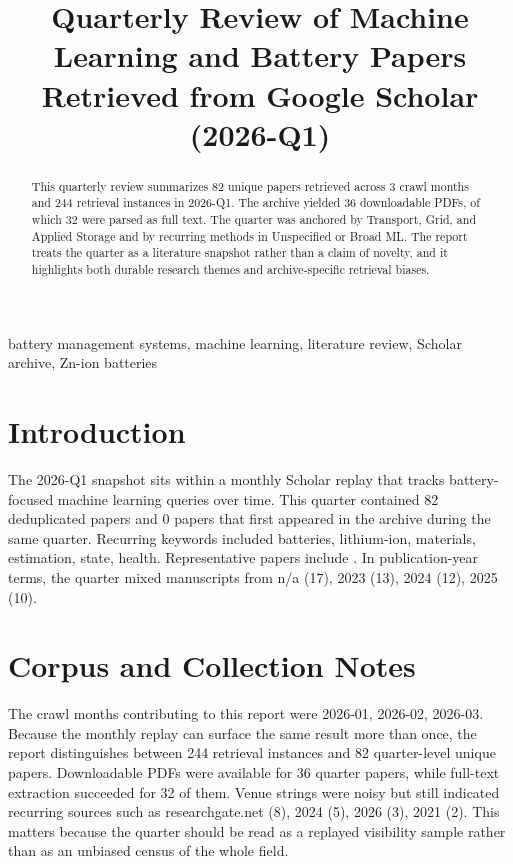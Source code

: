\documentclass[conference]{IEEEtran}
\begin{document}
\title{ Quarterly Review of Machine Learning and Battery Papers Retrieved from Google Scholar (2026-Q1) }

\author{
}

\maketitle

\begin{abstract}
This quarterly review summarizes 82 unique papers retrieved across 3 crawl months and 244 retrieval instances in 2026-Q1. The archive yielded 36 downloadable PDFs, of which 32 were parsed as full text. The quarter was anchored by Transport, Grid, and Applied Storage and by recurring methods in Unspecified or Broad ML. The report treats the quarter as a literature snapshot rather than a claim of novelty, and it highlights both durable research themes and archive-specific retrieval biases.
\end{abstract}

\begin{IEEEkeywords}
battery management systems, machine learning, literature review, Scholar archive, Zn-ion batteries
\end{IEEEkeywords}

\section{Introduction}
The 2026-Q1 snapshot sits within a monthly Scholar replay that tracks battery-focused machine learning queries over time. This quarter contained 82 deduplicated papers and 0 papers that first appeared in the archive during the same quarter. Recurring keywords included batteries, lithium-ion, materials, estimation, state, health. Representative papers include \cite{stateestimationof2023,textminingfor2022,recentadvancesin2025,section02assessingna}. In publication-year terms, the quarter mixed manuscripts from n/a (17), 2023 (13), 2024 (12), 2025 (10).

\section{Corpus and Collection Notes}
The crawl months contributing to this report were 2026-01, 2026-02, 2026-03. Because the monthly replay can surface the same result more than once, the report distinguishes between 244 retrieval instances and 82 quarter-level unique papers. Downloadable PDFs were available for 36 quarter papers, while full-text extraction succeeded for 32 of them. Venue strings were noisy but still indicated recurring sources such as researchgate.net (8), 2024 (5), 2026 (3), 2021 (2). This matters because the quarter should be read as a replayed visibility sample rather than as an unbiased census of the whole field.
\end{document}
